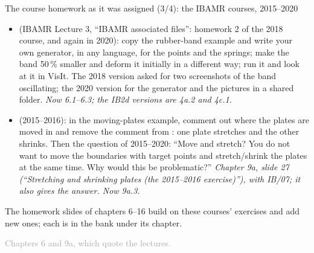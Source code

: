 \documentclass[aspectratio=169,11pt]{beamer}
\newcommand{\sourcecredit}[1]{\vfill\begin{flushright}\tiny\textcolor{DarkGray}{#1}\end{flushright}}
\begin{document}
\begin{frame}{The course homework as it was assigned (3/4): the IBAMR courses, 2015--2020}
\label{fr:hw3}
\footnotesize
\begin{itemize}\setlength{\itemsep}{3pt}
  \item {} (IBAMR Lecture 3, ``IBAMR associated files'': homework 2 of the 2018 course, and again in 2020): copy the rubber-band example and write your own generator, in any language, for the  points and the  springs; make the band 50\,\% smaller and deform it initially in a different way; run it and look at it in VisIt. The 2018 version asked for two screenshots of the band oscillating; the 2020 version for the generator and the pictures in a shared folder. \emph{Now 6.1--6.3; the IB2d versions are 4a.2 and 4c.1.}
  \item {} (2015--2016): in the moving-plates example, comment out where the plates are moved in  and remove the comment from : one plate stretches and the other shrinks. Then the question of 2015--2020: ``Move and stretch? You do not want to move the boundaries with target points and stretch/shrink the plates at the same time. Why would this be problematic?'' \emph{Chapter 9a, slide 27 (``Stretching and shrinking plates (the 2015--2016 exercise)''), with IB/07; it also gives the answer. Now 9a.3.}
\end{itemize}
\vspace{1mm}
The homework slides of chapters 6--16 build on these courses' exercises and add new ones; each is in the bank under its chapter.
\sourcecredit{Chapters 6 and 9a, which quote the lectures.}
\end{frame}
\end{document}
